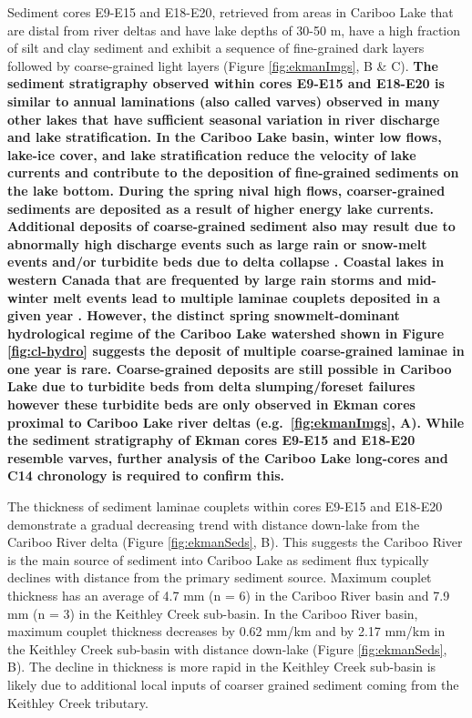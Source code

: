 \documentclass[Royal,times,doublespace,sageh]{sagej}
\begin{document}
Sediment cores E9-E15 and E18-E20, retrieved from areas in Cariboo Lake
that are distal from river deltas and have lake depths of 30-50 m, have
a high fraction of silt and clay sediment and exhibit a sequence of
fine-grained dark layers followed by coarse-grained light layers (Figure
\ref{fig:ekmanImgs}, B \& C). \textbf{The sediment stratigraphy observed
within cores E9-E15 and E18-E20 is similar to annual laminations (also
called varves) observed in many other lakes
\citep{Cockburn2008, Zolitschka2015a, Heideman2015, Hodder2006b, Desloges1999}
that have sufficient seasonal variation in river discharge and lake
stratification. In the Cariboo Lake basin, winter low flows, lake-ice
cover, and lake stratification reduce the velocity of lake currents and
contribute to the deposition of fine-grained sediments on the lake
bottom. During the spring nival high flows, coarser-grained sediments
are deposited as a result of higher energy lake currents. Additional
deposits of coarse-grained sediment also may result due to abnormally
high discharge events such as large rain or snow-melt events and/or
turbidite beds due to delta collapse \citep{sabatier2022}. Coastal lakes
in western Canada that are frequented by large rain storms and
mid-winter melt events lead to multiple laminae couplets deposited in a
given year \citep{Menounos2008c}. However, the distinct spring
snowmelt-dominant hydrological regime of the Cariboo Lake watershed
shown in Figure \ref{fig:cl-hydro} suggests the deposit of multiple
coarse-grained laminae in one year is rare. Coarse-grained deposits are
still possible in Cariboo Lake due to turbidite beds from delta
slumping/foreset failures however these turbidite beds are only observed
in Ekman cores proximal to Cariboo Lake river deltas
(e.g.~\ref{fig:ekmanImgs}, A). While the sediment stratigraphy of Ekman
cores E9-E15 and E18-E20 resemble varves, further analysis of the
Cariboo Lake long-cores and C14 chronology is required to confirm this.}

The thickness of sediment laminae couplets within cores E9-E15 and
E18-E20 demonstrate a gradual decreasing trend with distance down-lake
from the Cariboo River delta (Figure \ref{fig:ekmanSeds}, B). This
suggests the Cariboo River is the main source of sediment into Cariboo
Lake as sediment flux typically declines with distance from the primary
sediment source. Maximum couplet thickness has an average of 4.7 mm (n =
6) in the Cariboo River basin and 7.9 mm (n = 3) in the Keithley Creek
sub-basin. In the Cariboo River basin, maximum couplet thickness
decreases by 0.62 mm/km and by 2.17 mm/km in the Keithley Creek
sub-basin with distance down-lake (Figure \ref{fig:ekmanSeds}, B). The
decline in thickness is more rapid in the Keithley Creek sub-basin is
likely due to additional local inputs of coarser grained sediment coming
from the Keithley Creek tributary.
\end{document}
